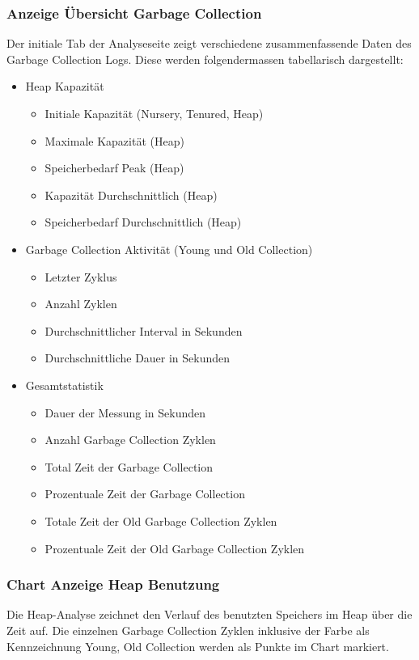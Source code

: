 \subsubsection{Anzeige Übersicht Garbage Collection}
Der initiale Tab der Analyseseite zeigt verschiedene zusammenfassende Daten des Garbage Collection Logs. Diese werden folgendermassen tabellarisch dargestellt:
\begin{itemize}
	\item Heap Kapazität
	\begin{itemize}
		\item Initiale Kapazität (Nursery, Tenured, Heap)
		\item Maximale Kapazität (Heap)
		\item Speicherbedarf Peak (Heap)
		\item Kapazität Durchschnittlich (Heap)
		\item Speicherbedarf Durchschnittlich (Heap)
	\end{itemize}
	\item Garbage Collection Aktivität (Young und Old Collection)
	\begin{itemize}
		\item Letzter Zyklus
		\item Anzahl Zyklen
		\item Durchschnittlicher Interval in Sekunden
		\item Durchschnittliche Dauer in Sekunden		
	\end{itemize}	
	\item Gesamtstatistik
	\begin{itemize}
		\item Dauer der Messung in Sekunden
		\item Anzahl Garbage Collection Zyklen
		\item Total Zeit der Garbage Collection
		\item Prozentuale Zeit der Garbage Collection
		\item Totale Zeit der Old Garbage Collection Zyklen
		\item Prozentuale Zeit der Old Garbage Collection Zyklen
	\end{itemize}
\end{itemize}

\subsubsection{Chart Anzeige Heap Benutzung}
Die Heap-Analyse zeichnet den Verlauf des benutzten Speichers im Heap über die Zeit auf. Die einzelnen Garbage Collection Zyklen inklusive der Farbe als Kennzeichnung Young, Old Collection werden als Punkte im Chart markiert.

